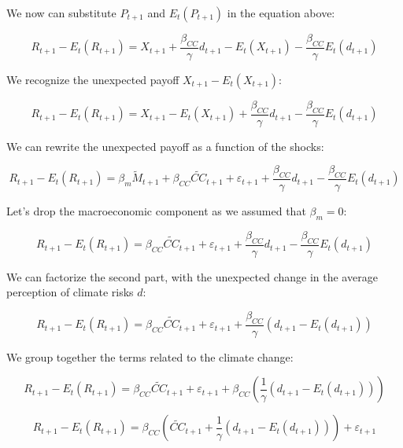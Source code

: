 We now can substitute $P_{t+1}$ and $E_t(P_{t+1})$ in the equation above:

\begin{equation}
    R_{t+1} - E_t(R_{t+1}) = X_{t+1} + \frac{\beta_{CC}}{\gamma}d_{t+1} - E_t(X_{t+1}) - \frac{\beta_{CC}}{\gamma}E_t(d_{t+1})
\end{equation}

We recognize the unexpected payoff $X_{t+1} - E_t(X_{t+1})$:

\begin{equation}
    R_{t+1} - E_t(R_{t+1}) = X_{t+1} - E_t(X_{t+1}) + \frac{\beta_{CC}}{\gamma}d_{t+1} - \frac{\beta_{CC}}{\gamma}E_t(d_{t+1})
\end{equation}

We can rewrite the unexpected payoff as a function of the shocks:

\begin{equation}
    R_{t+1} - E_t(R_{t+1}) = \beta_m \tilde{M}_{t+1} + \beta_{CC} \tilde{CC}_{t+1} + \varepsilon_{t+1} + \frac{\beta_{CC}}{\gamma}d_{t+1} - \frac{\beta_{CC}}{\gamma}E_t(d_{t+1})
\end{equation}

Let's drop the macroeconomic component as 
we assumed that $\beta_m = 0$:

\begin{equation}
    R_{t+1} - E_t(R_{t+1}) = \beta_{CC} \tilde{CC}_{t+1} + \varepsilon_{t+1} + \frac{\beta_{CC}}{\gamma}d_{t+1} - \frac{\beta_{CC}}{\gamma}E_t(d_{t+1})
\end{equation}

We can factorize the second part, with
the unexpected change in the average perception of climate risks $d$:

\begin{equation}
    R_{t+1} - E_t(R_{t+1}) = \beta_{CC} \tilde{CC}_{t+1} + \varepsilon_{t+1} + \frac{\beta_{CC}}{\gamma}(d_{t+1} - E_t(d_{t+1}))
\end{equation}

We group together the terms related to the climate change:

\begin{equation}
    R_{t+1} - E_t(R_{t+1}) = \beta_{CC} \tilde{CC}_{t+1} + \varepsilon_{t+1} + \beta_{CC} \left( \frac{1}{\gamma}(d_{t+1} - E_t(d_{t+1})) \right)
\end{equation}

\begin{equation}
    R_{t+1} - E_t(R_{t+1}) = \beta_{CC} \left(\tilde{CC}_{t+1} + \frac{1}{\gamma}(d_{t+1} - E_t(d_{t+1})) \right) + \varepsilon_{t+1}
\end{equation}

